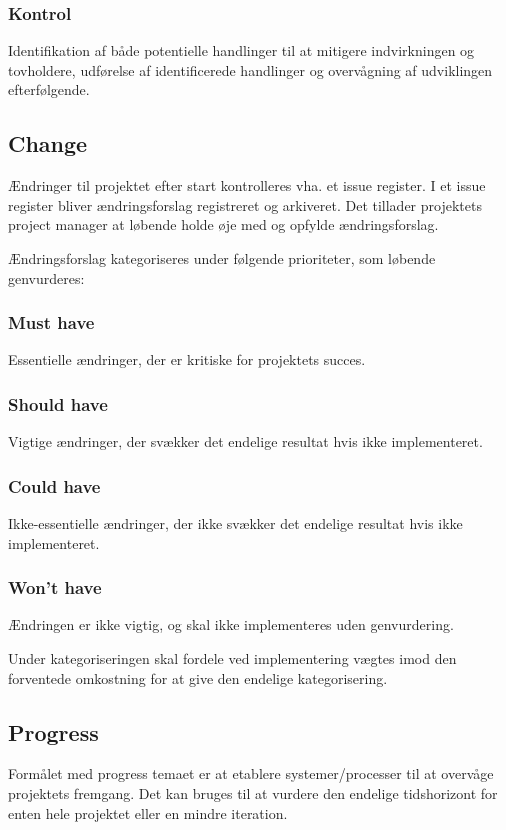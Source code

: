 \documentclass[12pt,twoside]{article}
\begin{document}
    \subsubsection*{Kontrol}
    Identifikation af både potentielle handlinger til at mitigere indvirkningen og tovholdere, udførelse af identificerede handlinger og overvågning af udviklingen efterfølgende.

    \subsection{Change}
    Ændringer til projektet efter start kontrolleres vha. et issue register. I et issue register bliver ændringsforslag registreret og arkiveret. Det tillader projektets project manager at løbende holde øje med og opfylde ændringsforslag.

    Ændringsforslag kategoriseres under følgende prioriteter, som løbende genvurderes:

    \subsubsection*{Must have}
    Essentielle ændringer, der er kritiske for projektets succes.

    \subsubsection*{Should have}
    Vigtige ændringer, der svækker det endelige resultat hvis ikke implementeret.

    \subsubsection*{Could have}
    Ikke-essentielle ændringer, der ikke svækker det endelige resultat hvis ikke implementeret.

    \subsubsection*{Won't have}
    Ændringen er ikke vigtig, og skal ikke implementeres uden genvurdering.

    Under kategoriseringen skal fordele ved implementering vægtes imod den forventede omkostning for at give den endelige kategorisering.

    \subsection{Progress}
    Formålet med progress temaet er at etablere systemer/processer til at overvåge projektets fremgang. Det kan bruges til at vurdere den endelige tidshorizont for enten hele projektet eller en mindre iteration.
\end{document}
